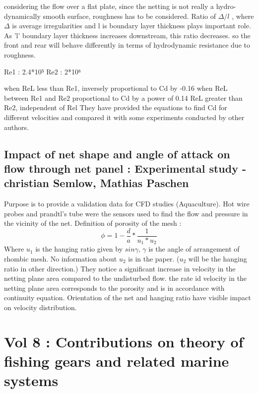 \documentclass[letterpaper,12pt]{article}
\begin{document}
considering the flow over a flat plate, since the netting is not really a hydro-dynamically smooth surface, roughness has to be considered. Ratio of $\Delta/l$ , where $\Delta$ is average irregularities and l is boundary layer thickness plays important role. As 'l' boundary layer thickness increases downstream, this ratio decreases.  so the front and rear will behave differently in terms of hydrodynamic resistance due to roughness.

Re1 : 2.4*10⁵ 
Re2 : 2*10⁶

when ReL less than Re1, inversely proportional to Cd by -0.16
when ReL between Re1 and Re2 proportional to Cd by a power of 0.14
ReL greater than Re2, independent of Rel 
They have provided the equations to find Cd for different velocities and compared it with some experiments conducted by other authors.
\subsection{Impact of net shape and angle of attack on flow through net panel : Experimental study - christian Semlow, Mathias Paschen}
Purpose is to provide a validation data for CFD studies (Aquaculture). Hot wire probes and prandtl's tube were the sensors used to find the flow and pressure in the vicinity of the net.
Definition of porosity of the mesh : 
\begin{equation}
    \phi= 1 - \frac{d}{a}*\frac{1}{u_1*u_2}
\end{equation}
Where $u_1$ is the hanging ratio given by $sin\gamma$, $\gamma$ is the angle of arrangement of rhombic mesh. No information about $u_2$ is in the paper. ($u_2$ will be the hanging ratio in other direction.)
They notice a significant increase in velocity in the netting plane area compared to the undisturbed flow. the rate id velocity in the netting plane area corresponds to the porosity and is in accordance with continuity equation. Orientation of the net and hanging ratio have visible impact on velocity distribution.


\section{Vol 8 : Contributions on theory of fishing gears and related marine systems}
\end{document}
